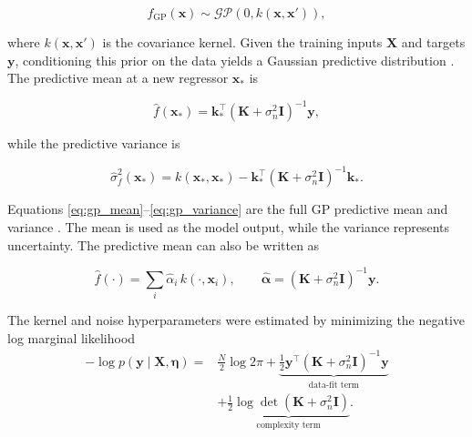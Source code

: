 \begin{equation}
f_{\mathrm{GP}}(\mathbf{x})
\sim
\mathcal{GP}\!\left(0,k(\mathbf{x},\mathbf{x}')\right),
\end{equation}

where \(k(\mathbf{x},\mathbf{x}')\) is the covariance kernel. Given the
training inputs \(\mathbf{X}\) and targets \(\mathbf{y}\), conditioning
this prior on the data yields a Gaussian predictive distribution
\cite{course5sc28}. The predictive mean at a new regressor
\(\mathbf{x}_{*}\) is

\begin{equation}
\hat{f}(\mathbf{x}_{*})
=
\mathbf{k}_{*}^{\top}
\left(
\mathbf{K}+\sigma_n^2\mathbf{I}
\right)^{-1}
\mathbf{y},
\label{eq:gp_mean}
\end{equation}

while the predictive variance is

\begin{equation}
\hat{\sigma}_{f}^{2}(\mathbf{x}_{*})
=
k(\mathbf{x}_{*},\mathbf{x}_{*})
-
\mathbf{k}_{*}^{\top}
\left(
\mathbf{K}+\sigma_n^2\mathbf{I}
\right)^{-1}
\mathbf{k}_{*}.
\label{eq:gp_variance}
\end{equation}

Equations \eqref{eq:gp_mean}--\eqref{eq:gp_variance} are the full GP
predictive mean and variance \cite{course5sc28}. The mean is used as the
model output, while the variance represents uncertainty. The predictive
mean can also be written as

\begin{equation}
\hat{f}(\cdot)
=
\sum_i \hat{\alpha}_i\,k(\cdot,\mathbf{x}_i),
\qquad
\hat{\boldsymbol{\alpha}}
=
\left(\mathbf{K}+\sigma_n^2\mathbf{I}\right)^{-1}\mathbf{y}.
\label{eq:gp_kernel_expansion}
\end{equation}

The kernel and noise hyperparameters were estimated by minimizing the
negative log marginal likelihood
\begin{equation}
\begin{aligned}
-\log p(\mathbf{y}\mid\mathbf{X},\boldsymbol{\eta})
={}& \tfrac{N}{2}\log 2\pi
+ \underbrace{\tfrac{1}{2}\mathbf{y}^{\top}\!\left(\mathbf{K}+\sigma_n^2\mathbf{I}\right)^{-1}\!\mathbf{y}}_{\text{data-fit term}}\\
&+ \underbrace{\tfrac{1}{2}\log\det\!\left(\mathbf{K}+\sigma_n^2\mathbf{I}\right)}_{\text{complexity term}}.
\end{aligned}
\label{eq:gp_marglik}
\end{equation}

